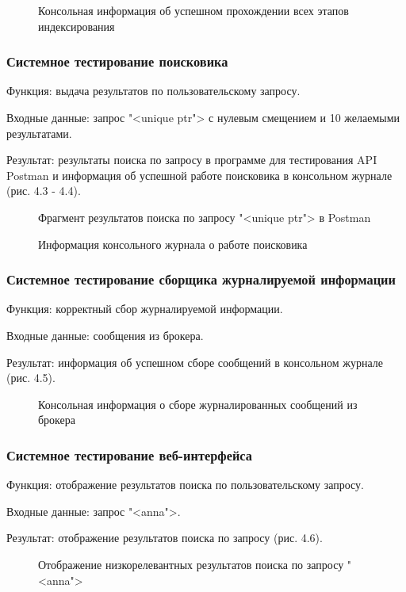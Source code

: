 \begin{figure}[H]
\caption{Консольная информация об успешном прохождении всех этапов индексирования}
\label{tests/indexer.png:image}
\end{figure}

\subsubsection{Системное тестирование поисковика}

Функция: выдача результатов по пользовательскому запросу.

Входные данные: запрос "<unique ptr"> с нулевым смещением и 10 желаемыми результатами.

Результат: результаты поиска по запросу в программе для тестирования API Postman и информация об успешной работе поисковика в консольном журнале (рис. 4.3 - 4.4).

\begin{figure}[H]
\caption{Фрагмент результатов поиска по запросу "<unique ptr"> в Postman}
\label{tests/searcher_results.png:image}
\end{figure}

\begin{figure}[H]
\caption{Информация консольного журнала о работе поисковика}
\label{tests/searcher_logs.png:image}
\end{figure}

\subsubsection{Системное тестирование сборщика журналируемой информации}

Функция: корректный сбор журналируемой информации.

Входные данные: сообщения из брокера.

Результат: информация об успешном сборе сообщений в консольном журнале (рис. 4.5).

\begin{figure}[H]
\caption{Консольная информация о сборе журналированных сообщений из брокера}
\label{tests/logger.png:image}
\end{figure}

\subsubsection{Системное тестирование веб-интерфейса}

Функция: отображение результатов поиска по пользовательскому запросу.

Входные данные: запрос "<anna">.

Результат: отображение результатов поиска по запросу (рис. 4.6).

\begin{figure}[H]
\caption{Отображение низкорелевантных результатов поиска по запросу "<anna">}
\label{tests/web.png:image}
\end{figure}